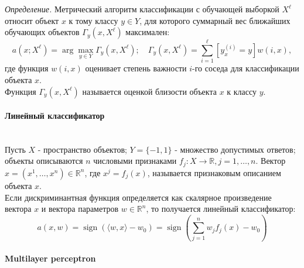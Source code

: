\emph{Определение.} Метрический алгоритм классификации с обучающей выборкой $X^{\ell}$ относит объект $x$ к тому классу $y \in Y$, для которого суммарный вес ближайших обучающих объектов $\Gamma_{y}\left(x, X^{\ell}\right)$ максимален:
$$
a\left(x ; X^{\ell}\right)=\arg \max _{y \in Y} \Gamma_{y}\left(x, X^{\ell}\right) ; \quad \Gamma_{y}\left(x, X^{\ell}\right)=\sum_{i=1}^{\ell}\left[y_{x}^{(i)}=y\right] w(i, x),
$$
где функция $w(i, x)$ оценивает степень важности $i$-го соседа для классификации объекта $x$. \\Функция $\Gamma_{y}\left(x, X^{\ell}\right)$ называется оценкой близости объекта $x$ к классу $y.$\cite{8}\\ 

        \paragraph
        {
        Линейный классификатор 
        }
        \noindent\\
        
        \noindent
        Пусть $X$ - пространство объектов; $Y=\{-1,1\}$ - множество допустимых ответов; объекты описываются $n$ числовыми признаками $f_{j}: X \rightarrow \mathbb{R}, j=1, \ldots, n$. Вектор $x=\left(x^{1}, \ldots, x^{n}\right) \in \mathbb{R}^{n}$, где $x^{j}=f_{j}(x)$, называется признаковым описанием объекта $x$.\\
        Если дискриминантная функция определяется как скалярное произведение вектора $x$ и вектора параметров $w \in \mathbb{R}^{n}$, то получается линейный классификатор:\cite{8}
$$
a(x, w)=\operatorname{sign}\left(\langle w, x\rangle-w_{0}\right)=\operatorname{sign}\left(\sum_{j=1}^{n} w_{j} f_{j}(x)-w_{0}\right)
$$ 
        \newpage
        \paragraph
        {
        Multilayer perceptron
        }
        \noindent\\
        

